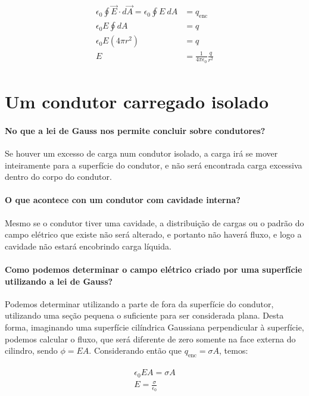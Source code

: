 \begin{multicols*}{2}
  \begin{gather}
    \begin{align}
      \epsilon_0 \oint \vec{E} \cdot d \vec{A} = \epsilon_0 \oint E \ dA &= q_{\text{enc}}\\ 
      \epsilon_0 E \oint dA &= q \\
      \epsilon_0 E (4 \pi r^2) &= q \\
      E &= \frac{1}{4 \pi \epsilon_0} \frac{q}{r^2}
    \end{align}
  \end{gather}

\section*{Um condutor carregado isolado}
  
  \paragraph{No que a lei de Gauss nos permite concluir sobre condutores?} Se houver um excesso de carga num condutor isolado, a carga irá se mover inteiramente para a superfície do condutor, e não será encontrada carga excessiva dentro do corpo do condutor.

  \paragraph{O que acontece con um condutor com cavidade interna?} Mesmo se o condutor tiver uma cavidade, a distribuição de cargas ou o padrão do campo elétrico que existe não será alterado, e portanto não haverá fluxo, e logo a cavidade não estará encobrindo carga líquida.

  \paragraph{Como podemos determinar o campo elétrico criado por uma superfície utilizando a lei de Gauss?} Podemos determinar utilizando a parte de fora da superfície do condutor, utilizando uma seção pequena o suficiente para ser considerada plana. Desta forma, imaginando uma superfície cilíndrica Gaussiana perpendicular à superfície, podemos calcular o fluxo, que será diferente de zero somente na face externa do cilindro, sendo $ \phi = EA $. Considerando então que $ q_{\text{enc}} = \sigma A $, temos:

  \begin{gather}
    \begin{align}
      \epsilon_0 E A  = \sigma A \\
      E = \frac{\sigma}{\epsilon_0}
    \end{align}
  \end{gather}


\end{multicols*}
